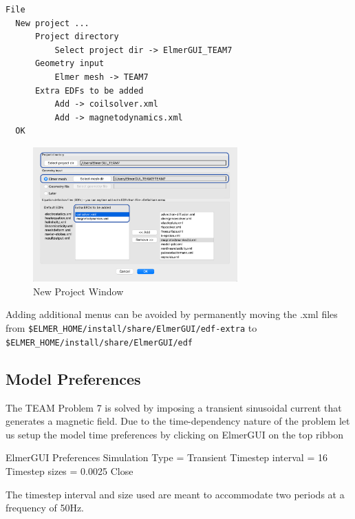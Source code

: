\begin{verbatim}
File
  New project ...
      Project directory 
          Select project dir -> ElmerGUI_TEAM7
      Geometry input
          Elmer mesh -> TEAM7
      Extra EDFs to be added
          Add -> coilsolver.xml
          Add -> magnetodynamics.xml
  OK
\end{verbatim}


\begin{figure}[H]
\centering
\includegraphics[width=0.7\textwidth]{figures/new_project.png}
\caption{New Project Window}\label{fg:new_project}
\end{figure}  


Adding additional menus can be avoided by permanently moving the .xml files from \texttt{\$ELMER\_HOME/install/share/ElmerGUI/edf-extra} to \texttt{\$ELMER\_HOME/install/share/ElmerGUI/edf}\\


\subsection*{Model Preferences}

The TEAM Problem 7 is solved by imposing a transient sinusoidal current that generates a magnetic field.  Due to the time-dependency nature of the problem let us setup the model time preferences by clicking on ElmerGUI on the top ribbon

\ttbegin
ElmerGUI
  Preferences 
    Simulation Type = Transient
    Timestep interval = 16
    Timestep sizes = 0.0025
  Close
\ttend

The timestep interval and size used are meant to accommodate two periods at a frequency of 50Hz.  


